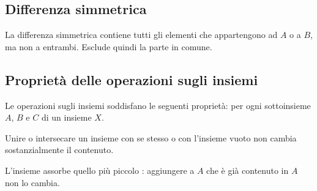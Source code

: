 \subsection{Differenza simmetrica}
La differenza simmetrica contiene tutti gli elementi che appartengono ad \(A\) o a \(B\), ma non a entrambi. Esclude quindi la parte in comune.
\begin{center}
\end{center}



\subsection{Proprietà delle operazioni sugli insiemi}
Le operazioni sugli insiemi soddisfano le seguenti proprietà: per
ogni sottoinsieme $A$, $B$ e $C$ di un insieme $ X$.


\begin{osservazione}
    Unire o intersecare un insieme con se stesso o con l'insieme vuoto non cambia sostanzialmente il contenuto.
\end{osservazione}
\begin{osservazione}
L'insieme  assorbe quello più piccolo : aggiungere a \(A\) che è già contenuto in \(A\) non lo cambia.
\end{osservazione}






